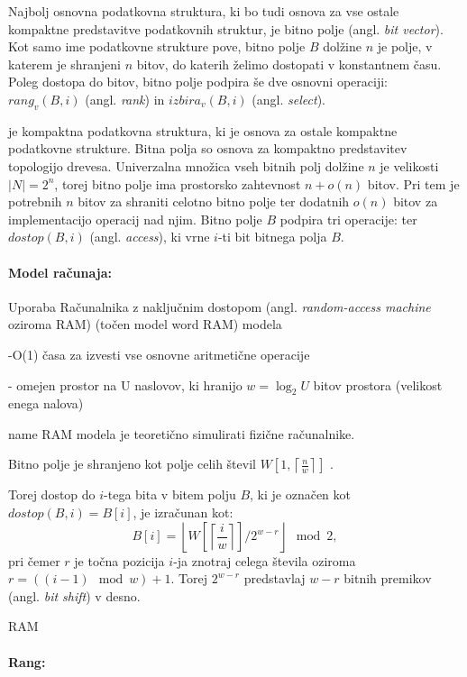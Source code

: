 Najbolj osnovna podatkovna struktura, ki bo tudi osnova za vse ostale kompaktne predstavitve podatkovnih struktur, je bitno polje (angl. \textit{bit vector}). Kot samo ime podatkovne strukture pove, bitno polje $B$ dolžine $n$ je polje, v katerem je shranjeni $n$ bitov, do katerih želimo dostopati v konstantnem času. Poleg dostopa do bitov, bitno polje podpira še dve osnovni operaciji: $rang_v(B,i)$ (angl. \textit{rank}) in $izbira_v(B,i)$ (angl. \textit{select}).

je kompaktna podatkovna struktura, ki je osnova za ostale kompaktne podatkovne strukture. Bitna polja so osnova za kompaktno predstavitev topologijo drevesa. Univerzalna množica vseh bitnih polj dolžine $n$ je velikosti $\left |N\right |=2^n$, torej bitno polje ima prostorsko zahtevnost $n+o(n)$ bitov. Pri tem je potrebnih $n$ bitov za shraniti celotno bitno polje ter dodatnih $o(n)$ bitov za implementacijo operacij nad njim. Bitno polje $B$ podpira tri operacije:  ter $dostop(B,i)$ (angl. \textit{access}), ki vrne $i$-ti bit bitnega polja $B$.

\paragraph{Model računaja:}

Uporaba Računalnika z naključnim dostopom (angl. \textit{random-access machine} oziroma RAM) (točen model word RAM) modela
    
    -O(1) časa za izvesti vse osnovne aritmetične operacije

    - omejen prostor na U naslovov, ki hranijo $w=\log_2{U}$ bitov prostora (velikost enega nalova)

name RAM modela je teoretično simulirati fizične računalnike.


Bitno polje je shranjeno kot polje celih števil $W\left[1,\left\lceil\frac{n}{w}\right\rceil\right]$ \cite{Navarro2016}.

Torej dostop do $i$-tega bita v bitem polju $B$, ki je označen kot $\textit{dostop}(B,i)=B[i]$, je izračunan kot:
$$
    B[i]=\left\lfloor W\left[\left\lceil\frac{i}{w}\right\rceil\right]/2^{w-r}\right\rfloor \mod{2},
$$
pri čemer $r$ je točna pozicija $i$-ja znotraj celega števila oziroma $r=((i-1)\mod{w}) +1$. Torej $2^{w-r}$ predstavlaj $w-r$ bitnih premikov (angl. \textit{bit shift})  v desno.

RAM

\paragraph{Rang:}

